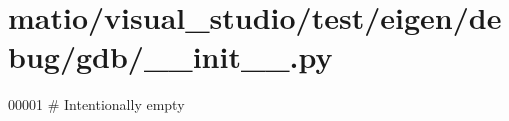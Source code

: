 \hypertarget{matio_2visual__studio_2test_2eigen_2debug_2gdb_2____init_____8py_source}{}\section{matio/visual\+\_\+studio/test/eigen/debug/gdb/\+\_\+\+\_\+init\+\_\+\+\_\+.py}
\label{matio_2visual__studio_2test_2eigen_2debug_2gdb_2____init_____8py_source}

\begin{DoxyCode}
00001 \textcolor{comment}{# Intentionally empty}
\end{DoxyCode}
